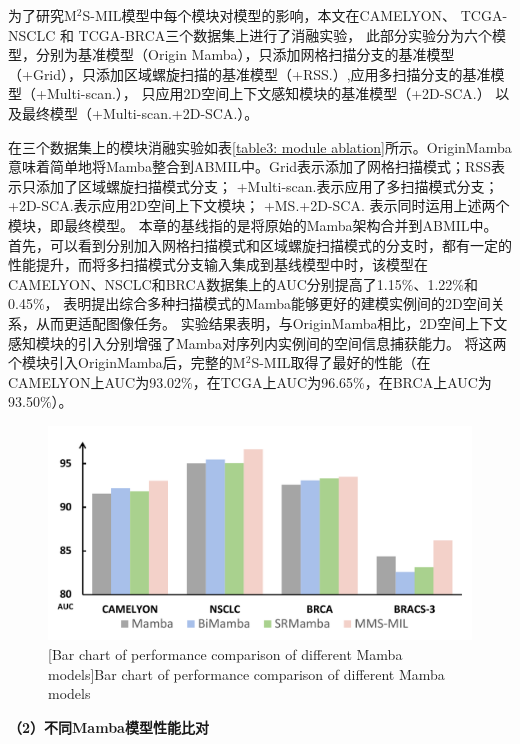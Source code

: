 为了研究M$^2$S-MIL模型中每个模块对模型的影响，本文在CAMELYON、 TCGA-NSCLC 和 TCGA-BRCA三个数据集上进行了消融实验，
此部分实验分为六个模型，分别为基准模型（Origin Mamba），只添加网格扫描分支的基准模型（+Grid），只添加区域螺旋扫描的基准模型（+RSS.）,应用多扫描分支的基准模型（+Multi-scan.），
只应用2D空间上下文感知模块的基准模型（+2D-SCA.） 以及最终模型（+Multi-scan.+2D-SCA.）。

在三个数据集上的模块消融实验如表\ref{table3: module ablation}所示。OriginMamba意味着简单地将Mamba整合到ABMIL中。Grid表示添加了网格扫描模式；RSS表示只添加了区域螺旋扫描模式分支；
+Multi-scan.表示应用了多扫描模式分支；+2D-SCA.表示应用2D空间上下文模块； +MS.+2D-SCA. 表示同时运用上述两个模块，即最终模型。
本章的基线指的是将原始的Mamba架构合并到ABMIL中。
首先，可以看到分别加入网格扫描模式和区域螺旋扫描模式的分支时，都有一定的性能提升，而将多扫描模式分支输入集成到基线模型中时，该模型在CAMELYON、NSCLC和BRCA数据集上的AUC分别提高了1.15\%、1.22\%和0.45\%，
表明提出综合多种扫描模式的Mamba能够更好的建模实例间的2D空间关系，从而更适配图像任务。
实验结果表明，与OriginMamba相比，2D空间上下文感知模块的引入分别增强了Mamba对序列内实例间的空间信息捕获能力。
将这两个模块引入OriginMamba后，完整的M$^2$S-MIL取得了最好的性能（在CAMELYON上AUC为93.02\%，在TCGA上AUC为96.65\%，在BRCA上AUC为93.50\%）。

\begin{figure}[ht]
  \centering
  \includegraphics[width=0.9\columnwidth]{figures/MMSMIL的不同Mamba比较.pdf}
  [Bar chart of performance comparison of different Mamba models]{Bar chart of performance comparison of different Mamba models}
  \label{figure3: DifferentMamba}
\end{figure}
\textbf{（2）不同Mamba模型性能比对}



